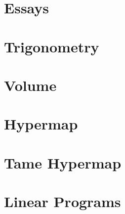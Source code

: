 \documentclass[cup9a]{cupbook}
\begin{document}
   \chapter{Essays}
   

    


    
    \chapter{Trigonometry}\label{part:trig}
      
    \chapter{Volume}
    
    \chapter{Hypermap}\label{chap:hypermap}
    



    
    
    
    
    \chapter{Tame Hypermap}
    

    
    \label{part:lp}
    \label{part:lprelax}
    \chapter{Linear Programs}
    \label{sec:lp}
    
\end{document}
